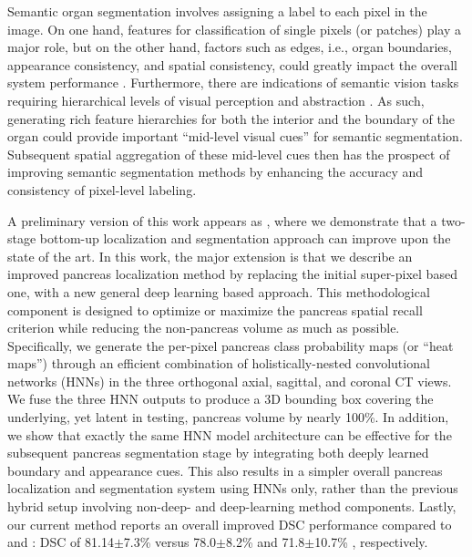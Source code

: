 \documentclass[journal]{IEEEtran}
\begin{document}
Semantic organ segmentation involves assigning a label to each pixel in the image. On one hand, features for classification of single pixels (or patches) play a major role, but on the other hand, factors such as edges, i.e., organ boundaries, appearance consistency, and spatial consistency, could greatly impact the overall system performance \cite{zheng2015conditional}. Furthermore, there are indications of semantic vision tasks requiring hierarchical levels of visual perception and abstraction \cite{xie2015holistically}. As such, generating rich feature hierarchies for both the interior and the boundary of the organ could provide important ``mid-level visual cues'' for semantic segmentation. Subsequent spatial aggregation of these mid-level cues then has the prospect of improving semantic segmentation methods by enhancing the accuracy and consistency of pixel-level labeling.

A preliminary version of this work appears as \cite{roth2016spatial}, where we demonstrate that a two-stage bottom-up localization and segmentation approach can improve upon the state of the art. In this work, the major extension is that we describe an improved pancreas localization method by replacing the initial super-pixel based one, with a new general deep learning based approach. This methodological component is designed to optimize or maximize the pancreas spatial recall criterion while reducing the non-pancreas volume as much as possible. Specifically, we generate the per-pixel pancreas class probability maps (or ``heat maps'') through an efficient combination of holistically-nested convolutional networks (HNNs) in the three orthogonal axial, sagittal, and coronal CT views. We fuse the three HNN outputs to produce a 3D bounding box covering the underlying, yet latent in testing, pancreas volume by nearly 100\%. In addition, we show that exactly the same HNN model architecture can be effective for the subsequent pancreas segmentation stage by integrating both deeply learned boundary and appearance cues. This also results in a simpler overall pancreas localization and segmentation system using HNNs only, rather than the previous hybrid setup involving non-deep- and deep-learning method components\cite{roth2016spatial}. Lastly, our current method reports an overall improved DSC performance compared to \cite{roth2016spatial} and \cite{roth2015deeporgan}: DSC of 81.14$\pm$7.3\% versus 78.0$\pm$8.2\% and 71.8$\pm$10.7\% \cite{roth2015deeporgan}, respectively.   
\end{document}

